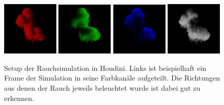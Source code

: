 \begin{figure}[h!]
	\centering
		\includegraphics[width=0.24\textwidth]{Grafiken/Implementation/Lightmaps/T1_R.png}
		\includegraphics[width=0.24\textwidth]{Grafiken/Implementation/Lightmaps/T1_G.png}
		\includegraphics[width=0.24\textwidth]{Grafiken/Implementation/Lightmaps/T1_B.png}
		\includegraphics[width=0.24\textwidth]{Grafiken/Implementation/Lightmaps/T1_A.png}
	
    \begin{footnotesize}
        \caption{Setup der Rauchsimulation in Houdini. Links ist beispielhaft ein Frame der Simulation in seine Farbkanäle aufgeteilt. 
        Die Richtungen aus denen der Rauch jeweils beleuchtet wurde ist dabei gut zu erkennen. }
    \end{footnotesize}
	\label{fig:lightDirections}
\end{figure}



